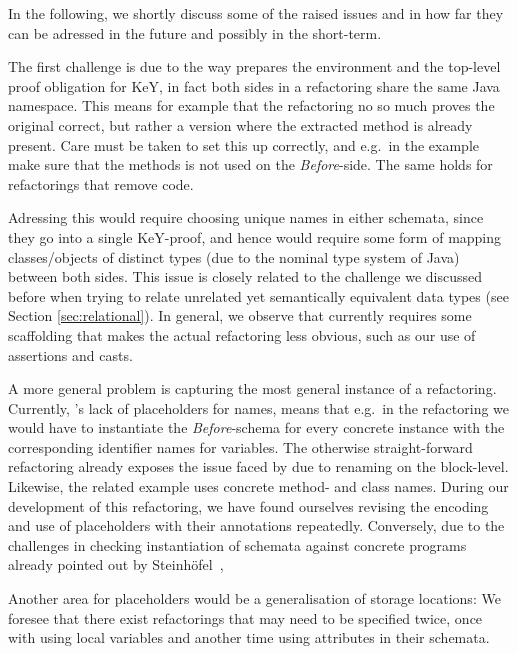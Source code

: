In the following, we shortly discuss some of the raised issues and in how far they can be adressed in the future and possibly in the short-term.

The first challenge is due to the way \Refinity{} prepares the environment and the top-level proof obligation for KeY,
in fact both sides in a refactoring share the same Java namespace.
This means for example that the  refactoring no so much proves the original correct, but rather a version where the extracted method is already present.
Care must be taken to set this up correctly, and e.g.\ in the  example make sure that the methods is not used on the \textit{Before}-side.
The same holds for refactorings that remove code.

Adressing this would require choosing unique names in either schemata, since they go into a single KeY-proof, and hence would require some form of mapping classes/objects of distinct types (due to the nominal type system of Java) between both sides.
This issue is closely related to the challenge we discussed before when trying to relate unrelated yet semantically equivalent data types (see Section \ref{sec:relational}).
In general, we observe that currently \Refinity{} requires some scaffolding that makes the actual refactoring less obvious,
such as our use of assertions and casts.

A more general problem is capturing the most general instance of a refactoring.
Currently, \Refinity{}'s lack of placeholders for names, means that e.g.\ in the  refactoring we would have to instantiate the \textit{Before}-schema for every concrete instance with the corresponding identifier names for variables.
The otherwise straight-forward refactoring  already exposes the issue faced by \Refinity{} due to renaming on the block-level.
Likewise, the related  example uses concrete method- and class names.
During our development of this refactoring, we have found ourselves revising the encoding and use of placeholders with their annotations repeatedly.
Conversely, due to the challenges in checking instantiation of schemata against concrete programs already pointed out by Steinhöfel~\cite[119,137]{steinhoefel-20},

Another area for placeholders would be a generalisation of storage locations:
We foresee that there exist refactorings that may need to be specified twice, once with using local variables and another time using attributes in their schemata.

